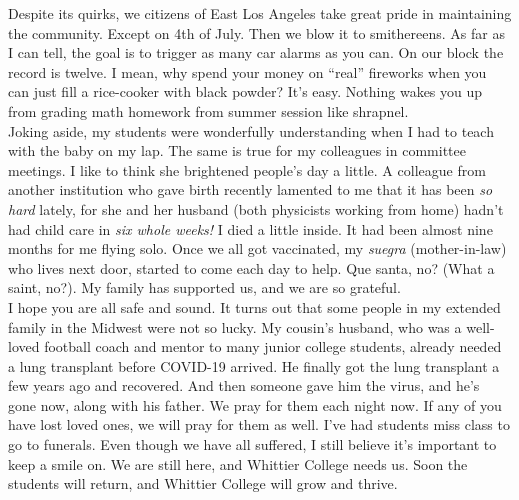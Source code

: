 \documentclass[../../main.tex]{subfiles}
\begin{document}
\vspace{0.25cm}
Despite its quirks, we citizens of East Los Angeles take great pride in maintaining the community.  Except on 4th of July.  Then we blow it to smithereens.  As far as I can tell, the goal is to trigger as many car alarms as you can.  On our block the record is twelve.  I mean, why spend your money on ``real'' fireworks when you can just fill a rice-cooker with black powder?  It's easy.  Nothing wakes you up from grading math homework from summer session like shrapnel.
\\
\vspace{0.25cm}
Joking aside, my students were wonderfully understanding when I had to teach with the baby on my lap.  The same is true for my colleagues in committee meetings.  I like to think she brightened people's day a little.  A colleague from another institution who gave birth recently lamented to me that it has been \textit{so hard} lately, for she and her husband (both physicists working from home) hadn't had child care in \textit{six whole weeks!}  I died a little inside.  It had been almost nine months for me flying solo.  Once we all got vaccinated, my \textit{suegra} (mother-in-law) who lives next door, started to come each day to help.  Que santa, no? (What a saint, no?).  My family has supported us, and we are so grateful.
\\
\vspace{0.25cm}
I hope you are all safe and sound.  It turns out that some people in my extended family in the Midwest were not so lucky.  My cousin's husband, who was a well-loved football coach and mentor to many junior college students, already needed a lung transplant before COVID-19 arrived.  He finally got the lung transplant a few years ago and recovered.  And then someone gave him the virus, and he's gone now, along with his father.  We pray for them each night now.  If any of you have lost loved ones, we will pray for them as well.  I've had students miss class to go to funerals.  Even though we have all suffered, I still believe it's important to keep a smile on.  We are still here, and Whittier College needs us.  Soon the students will return, and Whittier College will grow and thrive.
\end{document}
